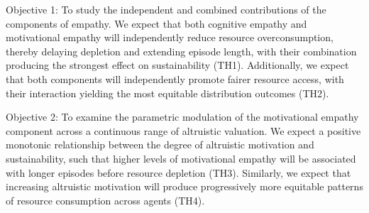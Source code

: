 Objective 1: To study the independent and combined contributions of the components of empathy. We expect that both cognitive empathy and motivational empathy will independently reduce resource overconsumption, thereby delaying depletion and extending episode length, with their combination producing the strongest effect on sustainability (TH1). Additionally, we expect that both components will independently promote fairer resource access, with their interaction yielding the most equitable distribution outcomes (TH2).

Objective 2: To examine the parametric modulation of the motivational empathy component across a continuous range of altruistic valuation. We expect a positive monotonic relationship between the degree of altruistic motivation and sustainability, such that higher levels of motivational empathy will be associated with longer episodes before resource depletion (TH3). Similarly, we expect that increasing altruistic motivation will produce progressively more equitable patterns of resource consumption across agents (TH4).

